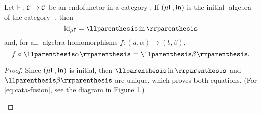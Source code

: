 \begin{lemma}
  \label{lem:cata-refl-fusion}


  Let $\mathsf{F}: \mathcal{C} \to \mathcal{C}$ be an endofunctor in a category
  . If $(\mu\mathsf{F},\operatorname{in})$ is the initial -algebra of
  the category -\alg, then
  \begin{equation}
    \label{eq:cata-refl}
    \idO{\mu\func{F}} = \cata\inmo
  \end{equation}
  and, for all -algebra homomorphisms $f: (a,\alpha) \to
  (b,\beta)$,
  \begin{equation}
    \label{eq:cata-fusion}
    f \comp \cata\alpha = \cata\beta
    \text{.}
  \end{equation}

  \begin{proof}

    Since $(\mu\mathsf{F},\operatorname{in})$ is initial, then $\cata\inmo$ and
    $\cata\beta$ are unique, which proves both equations. (For
    \eqref{eq:cata-fusion}, see the diagram in Figure
    \ref{fig:cata-fusion}.)

    \begin{figure}[htb]
      \begin{center}
      \end{center}
      \caption{}
      \label{fig:cata-fusion}
    \end{figure}

  \end{proof}

\end{lemma}

